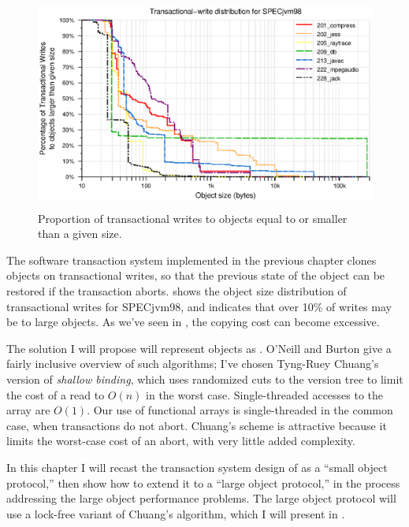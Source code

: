 \begin{figure}
\begin{center}
\includegraphics[height=2.75in,clip=true]{Figures/tr-w-all-1}%
\end{center}%
\caption{Proportion of transactional writes to objects equal to or
  smaller than a given size.}
\label{fig:tr-w}%
\end{figure}%
The software transaction system implemented in the previous chapter
clones objects on
transactional writes, so that the previous state of the object can be
restored if the transaction aborts.   shows the object
size distribution of transactional writes for SPECjvm98, and
indicates that over 10\% of writes may be to large objects.
As we've seen in , the copying cost can become
excessive.

The solution I will propose will
represent objects as .  O'Neill and Burton \cite{ONeillBu97} give a fairly
inclusive overview of such algorithms; I've chosen Tyng-Ruey Chuang's
version \cite{Chuang94} of \emph{shallow binding}, which uses
randomized cuts to the version tree to limit the cost of a read to
$O(n)$ in the worst case.  Single-threaded accesses to the array are
$O(1)$.  Our use of functional arrays is single-threaded in the common
case, when transactions do not abort.  Chuang's scheme is attractive
because it limits the worst-case cost of an abort, with very little
added complexity.

In this chapter I will recast the transaction system design of
 as a
``small object protocol,'' then show how to extend it to a ``large
object protocol,'' in the process addressing the large object performance
problems.  The large object protocol will use a lock-free variant of
Chuang's algorithm, which I will present in .

